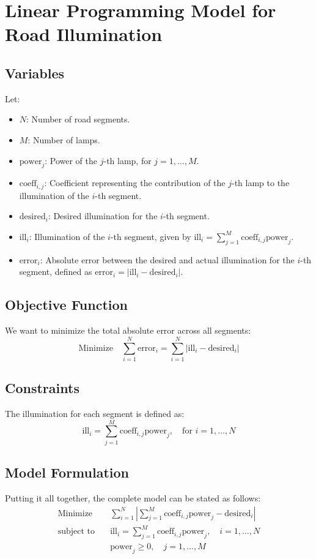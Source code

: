 \documentclass{article}
\begin{document}
\section*{Linear Programming Model for Road Illumination}

\subsection*{Variables}
Let:
\begin{itemize}
    \item \( N \): Number of road segments.
    \item \( M \): Number of lamps.
    \item \( \text{power}_j \): Power of the \( j \)-th lamp, for \( j = 1, \ldots, M \).
    \item \( \text{coeff}_{i,j} \): Coefficient representing the contribution of the \( j \)-th lamp to the illumination of the \( i \)-th segment.
    \item \( \text{desired}_i \): Desired illumination for the \( i \)-th segment.
    \item \( \text{ill}_i \): Illumination of the \( i \)-th segment, given by \( \text{ill}_i = \sum_{j=1}^{M} \text{coeff}_{i,j} \text{power}_j \).
    \item \( \text{error}_i \): Absolute error between the desired and actual illumination for the \( i \)-th segment, defined as \( \text{error}_i = |\text{ill}_i - \text{desired}_i| \).
\end{itemize}

\subsection*{Objective Function}
We want to minimize the total absolute error across all segments:
\[
\text{Minimize} \quad \sum_{i=1}^{N} \text{error}_i = \sum_{i=1}^{N} |\text{ill}_i - \text{desired}_i|
\]

\subsection*{Constraints}
The illumination for each segment is defined as:
\[
\text{ill}_i = \sum_{j=1}^{M} \text{coeff}_{i,j} \text{power}_j, \quad \text{for } i = 1, \ldots, N
\]

\subsection*{Model Formulation}
Putting it all together, the complete model can be stated as follows:
\begin{align*}
\text{Minimize} & \quad \sum_{i=1}^{N} |\sum_{j=1}^{M} \text{coeff}_{i,j} \text{power}_j - \text{desired}_i| \\
\text{subject to} & \quad \text{ill}_i = \sum_{j=1}^{M} \text{coeff}_{i,j} \text{power}_j, \quad i = 1, \ldots, N \\
& \quad \text{power}_j \geq 0, \quad j = 1, \ldots, M
\end{align*}
\end{document}
